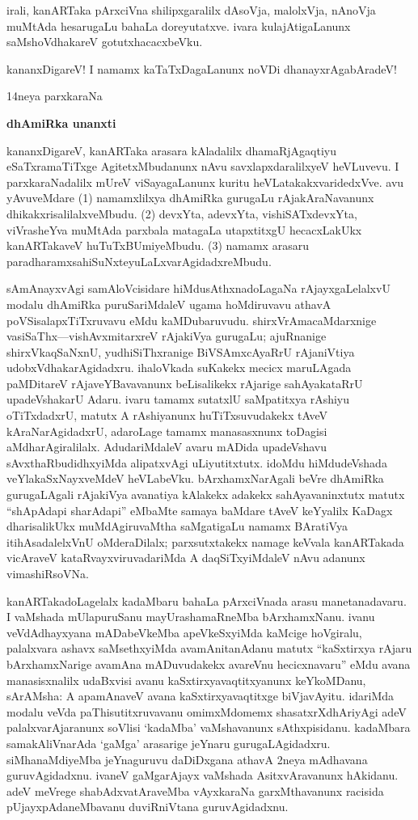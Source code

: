 \documentclass[11pt,a4size]{article}
\begin{document}
irali, kanARTaka pArxciVna shilipxgaralilx dAsoVja, malolxVja, nAnoVja
muMtAda hesarugaLu bahaLa doreyutatxve. ivara kulajAtigaLanunx
saMshoVdhakareV gotutxhacacxbeVku.

kananxDigareV! I namamx kaTaTxDagaLanunx noVDi dhanayxrAgabAradeV!

\newpage

\begin{center}
{\Huge 14neya parxkaraNa}

\smallskip
\textbf{\LARGE dhAmiRka unanxti}
\end{center} 

kananxDigareV, kanARTaka arasara kAladalilx dhamaRjAgaqtiyu
eSaTxramaTiTxge AgitetxMbudanunx nAvu savxlapxdaralilxyeV heVLuvevu. I
parxkaraNadalilx mUreV viSayagaLanunx kuritu
heVLatakakxvaridedxVve. avu yAvuveMdare (1) namamxlilxya dhAmiRka
gurugaLu rAjakAraNavanunx dhikakxrisalilalxveMbudu. (2) devxYta,
adevxYta, vishiSATxdevxYta, viVrasheYva muMtAda parxbala matagaLa
utapxtitxgU hecacxLakUkx kanARTakaveV huTuTxBUmiyeMbudu. (3) namamx
arasaru paradharamxsahiSuNxteyuLaLxvarAgidadxreMbudu.

sAmAnayxvAgi samAloVcisidare hiMdusAthxnadoLagaNa rAjayxgaLelalxvU
modalu dhAmiRka puruSariMdaleV ugama hoMdiruvavu athavA
poVSisalapxTiTxruvavu eMdu kaMDubaruvudu. shirxVrAmacaMdarxnige
vasiSaThx---vishAvxmitarxreV rAjakiVya gurugaLu; ajuRnanige
shirxVkaqSaNxnU, yudhiSiThxranige BiVSAmxcAyaRrU rAjaniVtiya
udobxVdhakarAgidadxru. ihaloVkada suKakekx mecicx maruLAgada
paMDitareV rAjaveYBavavanunx beLisalikekx rAjarige sahAyakataRrU
upadeVshakarU Adaru. ivaru tamamx sutatxlU saMpatitxya rAshiyu
oTiTxdadxrU, matutx A rAshiyanunx huTiTxsuvudakekx tAveV
kAraNarAgidadxrU, adaroLage tamamx manasasxnunx toDagisi
aMdharAgiralilalx. AdudariMdaleV avaru mADida upadeVshavu
sAvxthaRbudidhxyiMda alipatxvAgi uLiyutitxtutx. idoMdu hiMdudeVshada
veYlakaSxNayxveMdeV heVLabeVku. bArxhamxNarAgali beVre dhAmiRka
gurugaLAgali rAjakiVya avanatiya kAlakekx adakekx sahAyavaninxtutx
matutx ``shApAdapi sharAdapi'' eMbaMte samaya baMdare tAveV keYyalilx
KaDagx dharisalikUkx muMdAgiruvaMtha saMgatigaLu namamx BAratiVya
itihAsadalelxVnU oMderaDilalx; parxsutxtakekx namage keVvala
kanARTakada vicAraveV kataRvayxviruvadariMda A daqSiTxyiMdaleV nAvu
adanunx vimashiRsoVNa.

kanARTakadoLagelalx kadaMbaru bahaLa pArxciVnada arasu
manetanadavaru. I vaMshada mUlapuruSanu mayUrashamaRneMba
bArxhamxNanu. ivanu veVdAdhayxyana mADabeVkeMba apeVkeSxyiMda kaMcige
hoVgiralu, palalxvara ashavx saMsethxyiMda avamAnitanAdanu matutx
``kaSxtirxya rAjaru bArxhamxNarige avamAna mADuvudakekx avareVnu
hecicxnavaru'' eMdu avana manasisxnalilx udaBxvisi avanu
kaSxtirxyavaqtitxyanunx keYkoMDanu, sArAMsha: A apamAnaveV avana
kaSxtirxyavaqtitxge biVjavAyitu. idariMda modalu veVda
paThisutitxruvavanu omimxMdomemx shasatxrXdhAriyAgi adeV
palalxvarAjaranunx soVlisi `kadaMba' vaMshavanunx
sAthxpisidanu. kadaMbara samakAliVnarAda `gaMga' arasarige jeYnaru
gurugaLAgidadxru. siMhanaMdiyeMba jeYnaguruvu daDiDxgana athavA 2neya
mAdhavana guruvAgidadxnu. ivaneV gaMgarAjayx vaMshada AsitxvAravanunx
hAkidanu. adeV meVrege shabAdxvatAraveMba vAyxkaraNa garxMthavanunx
racisida pUjayxpAdaneMbavanu duviRniVtana guruvAgidadxnu.
\end{document}
